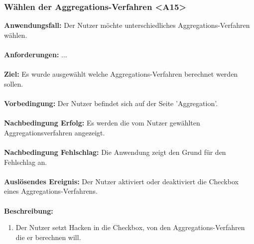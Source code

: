 \documentclass[parskip=full]{scrartcl} %
\begin{document}
\subsubsection*{Wählen der Aggregations-Verfahren <A15>}
\textbf{Anwendungsfall:} Der Nutzer möchte unterschiedliches Aggregations-Verfahren wählen.\\\\
\textbf{Anforderungen:} ...\\\\
\textbf{Ziel:} Es wurde ausgewählt welche Aggregations-Verfahren berechnet werden sollen.\\\\
\textbf{Vorbedingung:} Der Nutzer befindet sich auf der Seite 'Aggregation'.\\\\
\textbf{Nachbedingung Erfolg:} Es werden die vom Nutzer gewählten Aggregationsverfahren angezeigt.\\\\
\textbf{Nachbedingung Fehlschlag:} Die Anwendung zeigt den Grund für den Fehlschlag an. \\\\
\textbf{Auslösendes Ereignis:} Der Nutzer aktiviert oder deaktiviert die Checkbox eines Aggregations-Verfahrens. \\\\
\textbf{Beschreibung:}
\begin{enumerate}
    \item Der Nutzer setzt Hacken in die Checkbox, von den Aggregations-Verfahren die er berechnen will.
\end{enumerate}
\newpage
\end{document}
